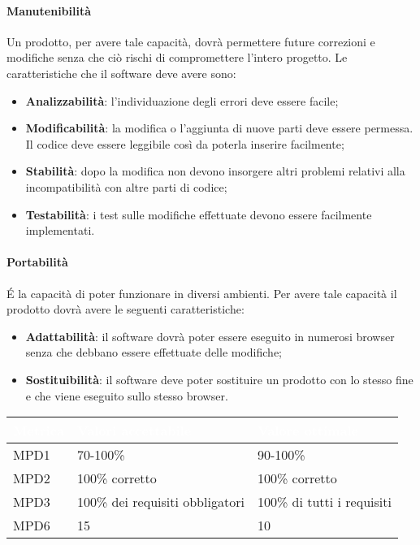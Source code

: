 \paragraph{Manutenibilità}
Un prodotto, per avere tale capacità, dovrà permettere future correzioni e modifiche senza che ciò rischi di compromettere l'intero progetto. Le caratteristiche che il software deve avere sono:
\begin{itemize}
\item \textbf{Analizzabilità}: l'individuazione degli errori deve essere facile;
\item \textbf{Modificabilità}: la modifica o l'aggiunta di nuove parti deve essere permessa. Il codice deve essere leggibile così da poterla inserire facilmente;
\item \textbf{Stabilità}: dopo la modifica non devono insorgere altri problemi relativi alla incompatibilità con altre parti di codice;
\item \textbf{Testabilità}: i test sulle modifiche effettuate devono essere facilmente implementati.
\end{itemize}

\paragraph{Portabilità}
\'E la capacità di poter funzionare in diversi ambienti. Per avere tale capacità il prodotto dovrà avere le seguenti caratteristiche:
\begin{itemize}
\item \textbf{Adattabilità}: il software dovrà poter essere eseguito in numerosi browser senza che debbano essere effettuate delle modifiche;
\item \textbf{Sostituibilità}: il software deve poter sostituire un prodotto con lo stesso fine e che viene eseguito sullo stesso browser. 
\end{itemize}

\renewcommand{\arraystretch}{1.5}
\centering
\begin{longtable}{C{2.5cm} C{4cm} C{4cm}}
\textcolor{white}{\textbf{Metrica}}&
\textcolor{white}{\textbf{Valori accettabile}}&
\textcolor{white}{\textbf{Valore ottimale}}\\	
\endhead
		MPD1 &  
		70-100\% & 
		90-100\% \\
		MPD2 & 
		100\% corretto & 
		100\% corretto \\
		MPD3 & 
		100\% dei requisiti obbligatori &
		100\% di tutti i requisiti \\
		MPD6 &  
		15 &
		10 \\
\end{longtable}